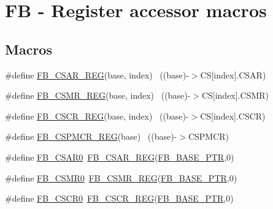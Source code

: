 \hypertarget{group___f_b___register___accessor___macros}{}\section{FB -\/ Register accessor macros}
\label{group___f_b___register___accessor___macros}
\subsection*{Macros}
\begin{DoxyCompactItemize}
\item 
\#define \hyperlink{group___f_b___register___accessor___macros_gab4eabed8c463260d1811c99bf92b8aaa}{F\+B\+\_\+\+C\+S\+A\+R\+\_\+\+R\+EG}(base,  index)                                ~((base)-\/$>$CS\mbox{[}index\mbox{]}.C\+S\+AR)
\item 
\#define \hyperlink{group___f_b___register___accessor___macros_gab85f399c0321b8598ed28acbb356e966}{F\+B\+\_\+\+C\+S\+M\+R\+\_\+\+R\+EG}(base,  index)                                ~((base)-\/$>$CS\mbox{[}index\mbox{]}.C\+S\+MR)
\item 
\#define \hyperlink{group___f_b___register___accessor___macros_ga103c332d2bf6b4de271753e3599d60de}{F\+B\+\_\+\+C\+S\+C\+R\+\_\+\+R\+EG}(base,  index)                                ~((base)-\/$>$CS\mbox{[}index\mbox{]}.C\+S\+CR)
\item 
\#define \hyperlink{group___f_b___register___accessor___macros_ga6fe638cb9de1da832ed97ec78038e98f}{F\+B\+\_\+\+C\+S\+P\+M\+C\+R\+\_\+\+R\+EG}(base)                                        ~((base)-\/$>$C\+S\+P\+M\+CR)
\item 
\#define \hyperlink{group___f_b___register___accessor___macros_ga444494eb7e637dcea435c4dc66ed7cd4}{F\+B\+\_\+\+C\+S\+A\+R0}~\hyperlink{group___f_b___register___accessor___macros_gab4eabed8c463260d1811c99bf92b8aaa}{F\+B\+\_\+\+C\+S\+A\+R\+\_\+\+R\+EG}(\hyperlink{group___f_b___peripheral_gace69013248279ed94480b3d6f6aa9fa6}{F\+B\+\_\+\+B\+A\+S\+E\+\_\+\+P\+TR},0)
\item 
\#define \hyperlink{group___f_b___register___accessor___macros_gae35baa34099e965e4d9da6d74c723412}{F\+B\+\_\+\+C\+S\+M\+R0}~\hyperlink{group___f_b___register___accessor___macros_gab85f399c0321b8598ed28acbb356e966}{F\+B\+\_\+\+C\+S\+M\+R\+\_\+\+R\+EG}(\hyperlink{group___f_b___peripheral_gace69013248279ed94480b3d6f6aa9fa6}{F\+B\+\_\+\+B\+A\+S\+E\+\_\+\+P\+TR},0)
\item 
\#define \hyperlink{group___f_b___register___accessor___macros_ga4dc6cf9d294cbc4edba6420b9f38a776}{F\+B\+\_\+\+C\+S\+C\+R0}~\hyperlink{group___f_b___register___accessor___macros_ga103c332d2bf6b4de271753e3599d60de}{F\+B\+\_\+\+C\+S\+C\+R\+\_\+\+R\+EG}(\hyperlink{group___f_b___peripheral_gace69013248279ed94480b3d6f6aa9fa6}{F\+B\+\_\+\+B\+A\+S\+E\+\_\+\+P\+TR},0)

\end{DoxyCompactItemize}
